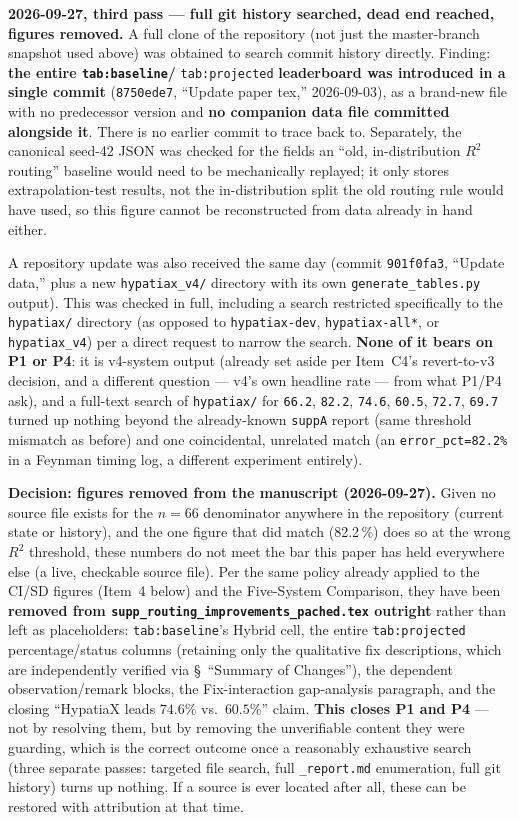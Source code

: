 \documentclass[11pt]{article}
\begin{document}
\textbf{2026-09-27, third pass --- full git history searched, dead end
reached, figures removed.} A full clone of the repository (not just the
master-branch snapshot used above) was obtained to search commit history
directly. Finding: \textbf{the entire \texttt{tab:baseline}/}
\texttt{tab:projected} \textbf{leaderboard was introduced in a single
commit} (\texttt{8750ede7}, ``Update paper tex,'' 2026-09-03), as a
brand-new file with no predecessor version and \textbf{no companion data
file committed alongside it}. There is no earlier commit to trace back to.
Separately, the canonical seed-42 JSON was checked for the fields an
``old, in-distribution $R^2$ routing'' baseline would need to be
mechanically replayed; it only stores extrapolation-test results, not the
in-distribution split the old routing rule would have used, so this figure
cannot be reconstructed from data already in hand either.

A repository update was also received the same day (commit
\texttt{901f0fa3}, ``Update data,'' plus a new \texttt{hypatiax\_v4/}
directory with its own \texttt{generate\_tables.py} output). This was
checked in full, including a search restricted specifically to the
\texttt{hypatiax/} directory (as opposed to \texttt{hypatiax-dev},
\texttt{hypatiax-all*}, or \texttt{hypatiax\_v4}) per a direct request to
narrow the search. \textbf{None of it bears on P1 or P4}: it is v4-system
output (already set aside per Item~C4's revert-to-v3 decision, and a
different question --- v4's own headline rate --- from what P1/P4 ask),
and a full-text search of \texttt{hypatiax/} for \texttt{66.2}, \texttt{82.2},
\texttt{74.6}, \texttt{60.5}, \texttt{72.7}, \texttt{69.7} turned up nothing
beyond the already-known \texttt{suppA} report (same threshold mismatch as
before) and one coincidental, unrelated match (an \texttt{error\_pct=82.2\%}
in a Feynman timing log, a different experiment entirely).

\textbf{Decision: figures removed from the manuscript (2026-09-27).}
Given no source file exists for the $n=66$ denominator anywhere in the
repository (current state or history), and the one figure that did match
(82.2\,\%) does so at the wrong $R^2$ threshold, these numbers do not meet
the bar this paper has held everywhere else (a live, checkable source
file). Per the same policy already applied to the CI/SD figures (Item~4
below) and the Five-System Comparison, they have been \textbf{removed
from \texttt{supp\_routing\_improvements\_pached.tex} outright} rather
than left as placeholders: \texttt{tab:baseline}'s Hybrid cell, the entire
\texttt{tab:projected} percentage/status columns (retaining only the
qualitative fix descriptions, which are independently verified via
\S~``Summary of Changes''), the dependent observation/remark blocks, the
Fix-interaction gap-analysis paragraph, and the closing
``HypatiaX leads $74.6\%$ vs.\ $60.5\%$'' claim. \textbf{This closes P1
and P4} --- not by resolving them, but by removing the unverifiable
content they were guarding, which is the correct outcome once a
reasonably exhaustive search (three separate passes: targeted file search,
full \texttt{\_report.md} enumeration, full git history) turns up nothing.
If a source is ever located after all, these can be restored with
attribution at that time.
\end{document}
